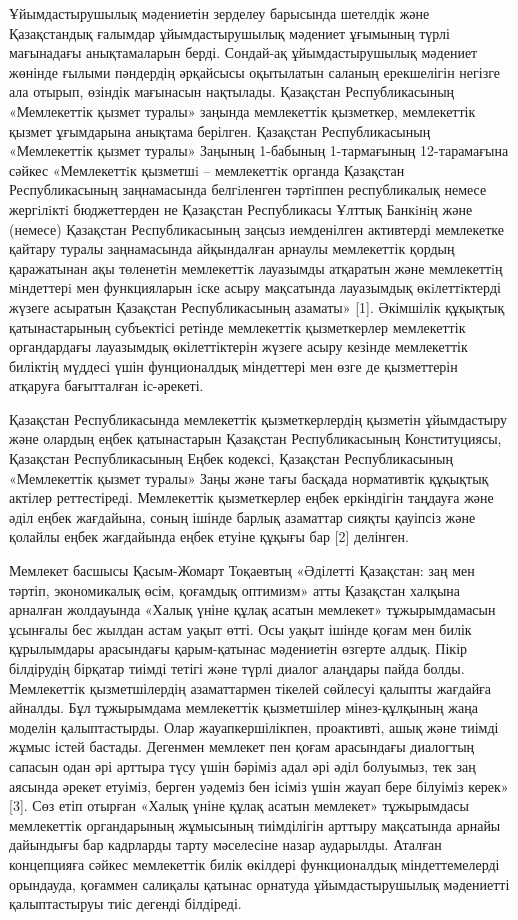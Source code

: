 Ұйымдастырушылық мәдениетін зерделеу барысында шетелдік және
Қазақстандық ғалымдар ұйымдастырушылық мәдениет ұғымының түрлі
мағынадағы анықтамаларын берді. Сондай-ақ ұйымдастырушылық мәдениет
жөнінде ғылыми пәндердің әрқайсысы оқытылатын саланың ерекшелігін
негізге ала отырып, өзіндік мағынасын нақтылады. Қазақстан
Республикасының «Мемлекеттік қызмет туралы» заңында мемлекеттік
қызметкер, мемлекеттік қызмет ұғымдарына анықтама берілген. Қазақстан
Республикасының «Мемлекеттік қызмет туралы» Заңының 1-бабының
1-тармағының 12-тарамағына сәйкес «Мемлекеттiк қызметшi -- мемлекеттiк
органда Қазақстан Республикасының заңнамасында белгiленген тәртiппен
республикалық немесе жергiлiктi бюджеттерден не Қазақстан Республикасы
Ұлттық Банкiнiң және (немесе) Қазақстан Республикасының заңсыз
иемденілген активтерді мемлекетке қайтару туралы заңнамасында
айқындалған арнаулы мемлекеттік қордың қаражатынан ақы төленетiн
мемлекеттiк лауазымды атқаратын және мемлекеттiң мiндеттерi мен
функцияларын iске асыру мақсатында лауазымдық өкiлеттiктерді жүзеге
асыратын Қазақстан Республикасының азаматы» {[}1{]}. Әкімшілік құқықтық
қатынастарының субъектісі ретінде мемлекеттік қызметкерлер мемлекеттік
органдардағы лауазымдық өкілеттіктерін жүзеге асыру кезінде мемлекеттік
биліктің мүддесі үшін фунционалдық міндеттері мен өзге де қызметтерін
атқаруға бағытталған іс-әрекеті.

Қазақстан Республикасында мемлекеттік қызметкерлердің қызметін
ұйымдастыру және олардың еңбек қатынастарын Қазақстан Республикасының
Конституциясы, Қазақстан Республикасының Еңбек кодексі, Қазақстан
Республикасының «Мемлекеттік қызмет туралы» Заңы және тағы басқада
нормативтік құқықтық актілер реттестіреді. Мемлекеттік қызметкерлер
еңбек еркіндігін таңдауға және әділ еңбек жағдайына, соның ішінде барлық
азаматтар сияқты қауіпсіз және қолайлы еңбек жағдайында еңбек етуіне
құқығы бар {[}2{]} делінген.

Мемлекет басшысы Қасым-Жомарт Тоқаевтың «Әділетті Қазақстан: заң мен
тәртіп, экономикалық өсім, қоғамдық оптимизм» атты Қазақстан халқына
арналған жолдауында «Халық үніне құлақ асатын мемлекет» тұжырымдамасын
ұсынғалы бес жылдан астам уақыт өтті. Осы уақыт ішінде қоғам мен билік
құрылымдары арасындағы қарым-қатынас мәдениетін өзгерте алдық. Пікір
білдірудің бірқатар тиімді тетігі және түрлі диалог алаңдары пайда
болды. Мемлекеттік қызметшілердің азаматтармен тікелей сөйлесуі қалыпты
жағдайға айналды. Бұл тұжырымдама мемлекеттік қызметшілер мінез-құлқының
жаңа моделін қалыптастырды. Олар жауапкершілікпен, проактивті, ашық және
тиімді жұмыс істей бастады. Дегенмен мемлекет пен қоғам арасындағы
диалогтың сапасын одан әрі арттыра түсу үшін бәріміз адал әрі әділ
болуымыз, тек заң аясында әрекет етуіміз, берген уәдеміз бен ісіміз үшін
жауап бере білуіміз керек» {[}3{]}. Сөз етіп отырған «Халық үніне құлақ
асатын мемлекет» тұжырымдасы мемлекеттік органдарының жұмысының
тиімділігін арттыру мақсатында арнайы дайындығы бар кадрларды тарту
мәселесіне назар аударылды. Аталған концепцияға сәйкес мемлекеттік билік
өкілдері функционалдық міндеттемелерді орындауда, қоғаммен салиқалы
қатынас орнатуда ұйымдастырушылық мәдениетті қалыптастыруы тиіс дегенді
білдіреді.

